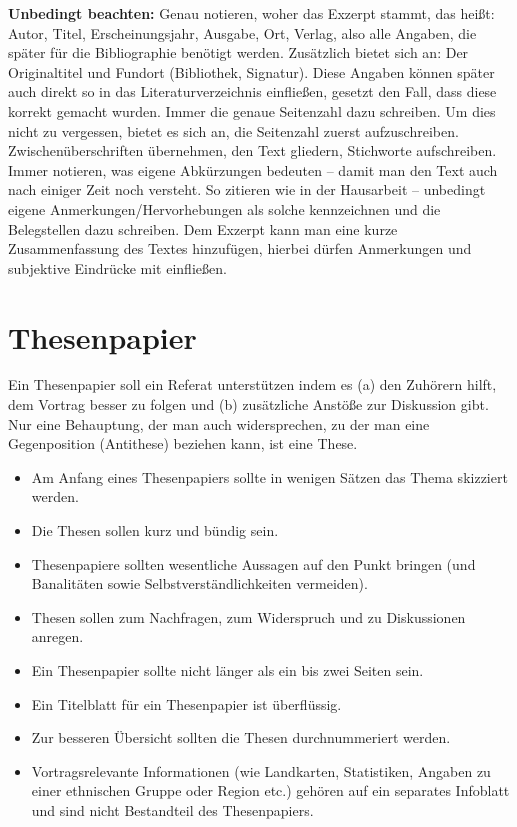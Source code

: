 \documentclass[ 12pt,
                titlepage,
                parskip=half,
                version=first,
                bibliography=totocnumbered,
                final,
                listof=totoc]{scrartcl}
\begin{document}
\textbf{Unbedingt beachten:} Genau notieren, woher das Exzerpt stammt, das
heißt: Autor, Titel, Erscheinungsjahr, Ausgabe, Ort, Verlag, also alle Angaben,
die später für die Bibliographie benötigt werden. Zusätzlich bietet sich an: Der
Originaltitel und Fundort (Bibliothek, Signatur). Diese Angaben können später
auch direkt so in das Literaturverzeichnis einfließen, gesetzt den Fall, dass
diese korrekt gemacht wurden. Immer die genaue Seitenzahl dazu schreiben. Um
dies nicht zu vergessen, bietet es sich an, die Seitenzahl zuerst
aufzuschreiben. Zwischenüberschriften übernehmen, den Text gliedern, Stichworte
aufschreiben. Immer notieren, was eigene Abkürzungen bedeuten -- damit man den
Text auch nach einiger Zeit noch versteht. So zitieren wie in der Hausarbeit --
unbedingt eigene Anmerkungen/Hervorhebungen als solche kennzeichnen und die
Belegstellen dazu schreiben. Dem Exzerpt kann man eine kurze Zusammenfassung des
Textes hinzufügen, hierbei dürfen Anmerkungen und subjektive Eindrücke mit
einfließen.

\section{Thesenpapier}
\label{sec:thesenpapier}

Ein Thesenpapier soll ein Referat unterstützen indem es (a) den Zuhörern hilft,
dem Vortrag besser zu folgen und (b) zusätzliche Anstöße zur Diskussion gibt.
Nur eine Behauptung, der man auch widersprechen, zu der man eine Gegenposition
(Antithese) beziehen kann, ist eine These.

\begin{itemize}
    \item Am Anfang eines Thesenpapiers sollte in wenigen Sätzen das Thema
    skizziert werden.
    \item Die Thesen sollen kurz und bündig sein.
    \item Thesenpapiere sollten wesentliche Aussagen auf den Punkt bringen (und
    Banalitäten sowie Selbstverständlichkeiten vermeiden).
    \item Thesen sollen zum Nachfragen, zum Widerspruch und zu Diskussionen
    anregen.
    \item Ein Thesenpapier sollte nicht länger als ein bis zwei Seiten sein.
    \item Ein Titelblatt für ein Thesenpapier ist überflüssig.
    \item Zur besseren Übersicht sollten die Thesen durchnummeriert werden.
    \item Vortragsrelevante Informationen (wie Landkarten, Statistiken, Angaben
    zu einer ethnischen Gruppe oder Region etc.) gehören auf ein separates
    Infoblatt und sind nicht Bestandteil des Thesenpapiers.
\end{itemize}
\end{document}

